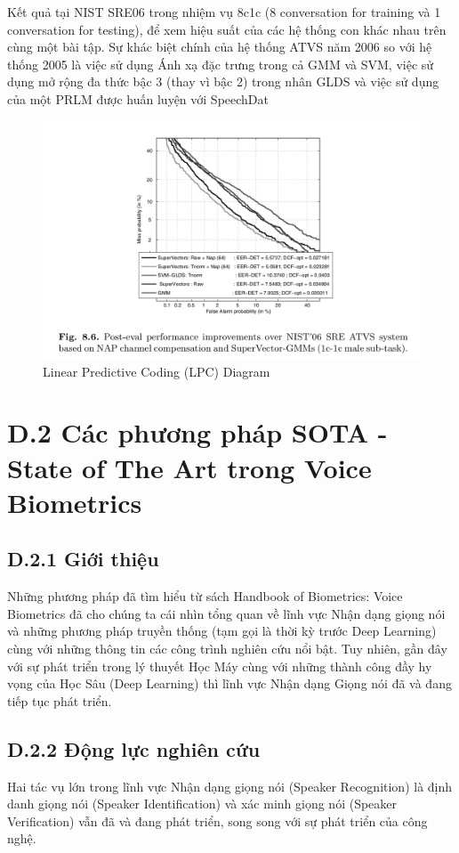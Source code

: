 \documentclass{article}
\begin{document}
	Kết quả tại NIST SRE06 trong nhiệm vụ 8c1c (8 conversation for training và 1 conversation for testing), để xem hiệu suất của các hệ thống con khác nhau trên cùng một bài tập. Sự khác biệt chính của hệ thống ATVS năm 2006 so với hệ thống 2005 là việc sử dụng Ánh xạ đặc trưng trong cả GMM và SVM, việc sử dụng mở rộng đa thức bậc 3 (thay vì bậc 2) trong nhân GLDS và việc sử dụng của một PRLM được huấn luyện với SpeechDat
	
	\begin{figure}[H]
		\centering
		\includegraphics[width=1\linewidth]{images/figure_8_6.png}
		\caption{Linear Predictive Coding (LPC) Diagram}
		\label{fig:writing-thesis}
	\end{figure}

	\section{D.2 Các phương pháp SOTA - State of The Art trong Voice Biometrics}
	\subsection{D.2.1 Giới thiệu}
	Những phương pháp đã tìm hiểu từ sách Handbook of Biometrics: Voice Biometrics đã cho chúng ta cái nhìn tổng quan về lĩnh vực Nhận dạng giọng nói và những phương pháp truyền thống (tạm gọi là thời kỳ trước Deep Learning) cùng với những thông tin các công trình nghiên cứu nổi bật. Tuy nhiên, gần đây với sự phát triển trong lý thuyết Học Máy cùng với những thành công đầy hy vọng của Học Sâu (Deep Learning) thì lĩnh vực Nhận dạng Giọng nói đã và đang tiếp tục phát triển.
	
	\subsection{D.2.2 Động lực nghiên cứu}
	Hai tác vụ lớn trong lĩnh vực Nhận dạng giọng nói (Speaker Recognition) là định danh giọng nói (Speaker Identification) và xác minh giọng nói (Speaker Verification) vẫn đã và đang phát triển, song song với sự phát triển của công nghệ.
	
\end{document}
